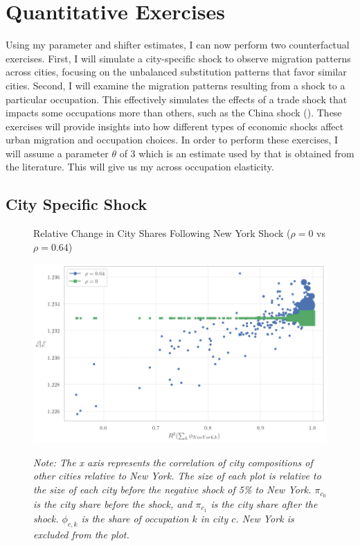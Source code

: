 \documentclass[10pt]{article}
\begin{document}
\section{Quantitative Exercises}

Using my parameter and shifter estimates, I can now perform two counterfactual exercises. First, I will simulate a city-specific shock to observe migration patterns across cities, focusing on the unbalanced substitution patterns that favor similar cities. Second, I will examine the migration patterns resulting from a shock to a particular occupation. This effectively simulates the effects of a trade shock that impacts some occupations more than others, such as the China shock (\cite{adh2013}). These exercises will provide insights into how different types of economic shocks affect urban migration and occupation choices. In order to perform these exercises, I will assume a parameter $\theta$ of 3 which is an estimate used by \cite{redding} that is obtained from the literature. This will give us my across occupation elasticity.

\subsection{City Specific Shock}

\begin{figure}[!htb]
    \centering
    \caption{Relative Change in City Shares Following New York Shock ($\rho = 0$ vs $\rho = 0.64$)}
    \includegraphics[width=\textwidth]{../../estimations/graphs/city_shock.png}
    \label{ny_change_graph}
    \caption*{\small\textit{Note: The x axis represents the correlation of city compositions of other cities relative to New York. The size of each plot is relative to the size of each city before the negative shock of 5\% to New York. $\pi_{c_0}$ is the city share before the shock, and $\pi_{c_1}$ is the city share after the shock. $\phi_{c, k}$ is the share of occupation $k$ in city $c$. New York is excluded from the plot.}}
\end{figure}
\end{document}
